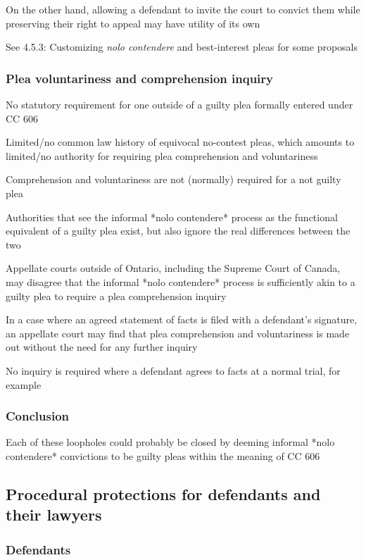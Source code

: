 On the other hand, allowing a defendant to invite the court to convict them while preserving their right to appeal may have utility of its own

See 4.5.3: Customizing \textit{nolo contendere} and best-interest pleas for some proposals

\subsubsection{Plea voluntariness and comprehension inquiry}

No statutory requirement for one outside of a guilty plea formally entered under CC 606

Limited/no common law history of equivocal no-contest pleas, which amounts to limited/no authority for requiring plea comprehension and voluntariness

Comprehension and voluntariness are not (normally) required for a not guilty plea

Authorities that see the informal *nolo contendere* process as the functional equivalent of a guilty plea exist, but also ignore the real differences between the two

Appellate courts outside of Ontario, including the Supreme Court of Canada, may disagree that the informal *nolo contendere* process is sufficiently akin to a guilty plea to require a plea comprehension inquiry

In a case where an agreed statement of facts is filed with a defendant's signature, an appellate court may find that plea comprehension and voluntariness is made out without the need for any further inquiry

No inquiry is required where a defendant agrees to facts at a normal trial, for example

\subsubsection{Conclusion}

Each of these loopholes could probably be closed by deeming informal *nolo contendere* convictions to be guilty pleas within the meaning of CC 606

\subsection{Procedural protections for defendants and their lawyers}

\subsubsection{Defendants}
